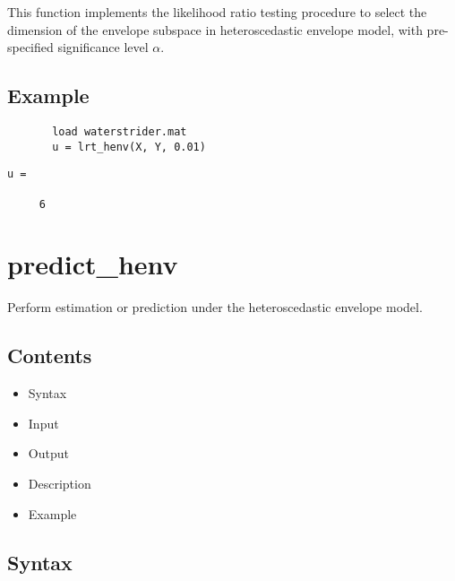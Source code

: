 \documentclass[a4paper,11pt,openany]{memoir}
\begin{document}
\begin{par}
This function implements the likelihood ratio testing procedure to select the dimension of the envelope subspace in heteroscedastic envelope model, with pre-specified significance level $\alpha$.
\end{par} \vspace{1em}


\subsection*{Example}


\begin{verbatim}       load waterstrider.mat
       u = lrt_henv(X, Y, 0.01)\end{verbatim}
    
        \color{lightgray}\ttfamily \begin{verbatim}
u =

     6

\end{verbatim} \rmfamily
\color{black}

\newpage

\rmfamily
\color{black}\section{predict\_henv}

\begin{par}
Perform estimation or prediction under the heteroscedastic envelope model.
\end{par} \vspace{1em}

\subsection*{Contents}

\begin{itemize}
\setlength{\itemsep}{-1ex}
   \item Syntax
   \item Input
   \item Output
   \item Description
   \item Example
\end{itemize}


\subsection*{Syntax}
\end{document}
